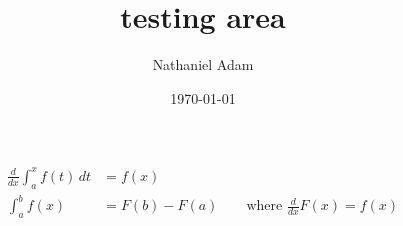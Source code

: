 \documentclass{article}
\title{testing area}
\author{Nathaniel Adam}
\date{\today}
\begin{document}
    \begin{align}
        \frac{d}{dx}\int_a^x f(t)\,dt &= f(x) \\
        \int_a^b f(x) &= F(b) - F(a) \qquad\text{where }\frac{d}{dx}F(x) = f(x)
    \end{align}
\end{document}
